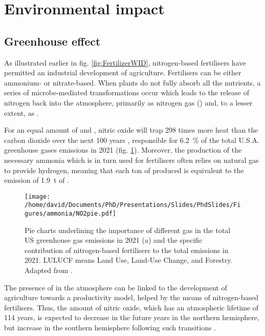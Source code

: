 \section{Environmental impact}

\subsection{Greenhouse effect}

As illustrated earlier in fig. \ref{fig:FertilizerWID}, nitrogen-based fertilisers have permitted an industrial development of agriculture.
Fertilisers can be either ammonium- or nitrate-based.
When plants do not fully absorb all the nutrients, a series of microbe-mediated transformations occur which leads to the release of nitrogen back into the atmosphere, primarily as nitrogen gas () and, to a lesser extent, as .

For an equal amount of  and , nitric oxide will trap \num{298} times more heat than the carbon dioxide over the next 100 years \parencite{MITCLIMATE}, responsible for \qty{6.2}{\percent} of the total U.S.A. greenhouse gases emissions in 2021 (fig. \ref{fig:PieGreenhouseNO2}).
Moreover, the production of the necessary ammonia which is in turn used for fertilisers often relies on natural gas to provide hydrogen, meaning that each ton of  produced is equivalent to the emission of \qty{1.9}{\tonne} of  \parencite{Rafiqul2005, Chen2018}.

\begin{figure}[!htb]
    \centering
    \texttt{[image: /home/david/Documents/PhD/Presentations/Slides/PhdSlides/Figures/ammonia/NO2pie.pdf]}
    \caption{
    Pie charts underlining the importance of different gas in the total US greenhouse gas emissions in 2021 (a) and the specific contribution of nitrogen-based fertilisers to the total  emissions in 2021.
    LULUCF means Land Use, Land-Use Change, and Forestry.
    Adapted from \cite{EPAGreenhouseGases}.
    }
    \label{fig:PieGreenhouseNO2}
\end{figure}

The presence of  in the atmosphere can be linked to the development of agriculture towards a productivity model, helped by the means of nitrogen-based fertilisers.
Thus, the amount of nitric oxide, which has an atmospheric lifetime of 114 years, is expected to decrease in the future years in the northern hemisphere, but increase in the southern hemisphere following such transitions \parencite{Solomon2007, Davidson2009}.


